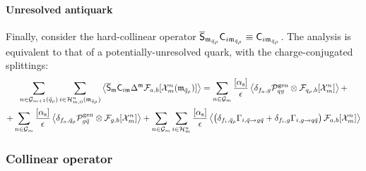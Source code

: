 \paragraph{Unresolved antiquark}

Finally, consider the hard-collinear operator $ \overline{\mathsf{S}}_{\mathfrak{m}_{\bar{q}_\rho}} \mathsf{C}_{i\mathfrak{m}_{\bar{q}_\rho}} \equiv \mathsf{C}_{i\mathfrak{m}_{\bar{q}_\rho}} $. The analysis is equivalent to that of a potentially-unresolved quark, with the charge-conjugated splittings:
\begin{multline}
  \sum_{n \in \mathcal{G}_{m+1}(\bar{q}_\rho)} \sum_{i \in \mathcal{H}^{n}_{m,0}(\mathfrak{m}_{\bar{q}_\rho})} \left\langle \overline{\mathsf{S}}_{\mathfrak{m}} \mathsf{C}_{i\mathfrak{m}} \Delta^{\mathfrak{m}} \mathcal{F}_{a,b}[\mathcal{X}^{n}_{m}(\mathfrak{m}_{\bar{q}_\rho})] \right\rangle = \sum_{n \in \mathcal{G}_m} \frac{[\alpha_\text{s}]}{\epsilon} \left\langle \delta_{f_a , g} \mathcal{P}^\text{gen}_{q g} \otimes \mathcal{F}_{q_\rho , b}[\mathcal{X}^{n}_{m}] \right\rangle + \\
  + \sum_{n \in \mathcal{G}_m} \frac{[\alpha_\text{s}]}{\epsilon} \left\langle \delta_{f_a , \bar{q}_\rho} \mathcal{P}^\text{gen}_{g \bar{q}} \otimes \mathcal{F}_{g,b}[\mathcal{X}^{n}_{m}] \right\rangle + \sum_{n \in \mathcal{G}_m} \sum_{i \in \mathcal{H}^{n}_{m}} \frac{[\alpha_\text{s}]}{\epsilon} \left\langle \left( \delta_{f_i , \bar{q}_\rho} \Gamma_{i , \bar{q} \rightarrow g \bar{q}} + \delta_{f_i , g} \Gamma_{i , g \rightarrow q \bar{q}} \right) \mathcal{F}_{a,b}[\mathcal{X}^{n}_{m}] \right\rangle
\end{multline}

\subsubsection{Collinear operator}


